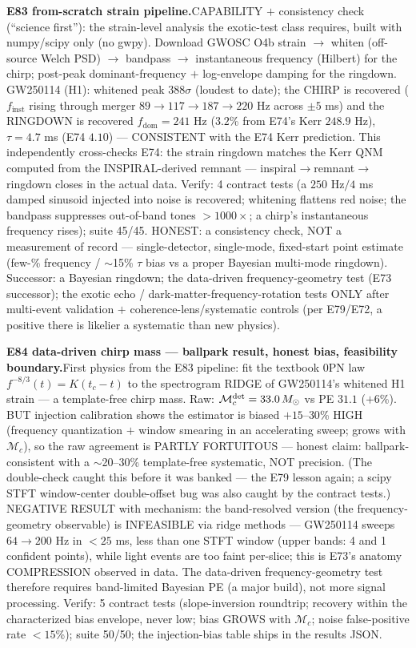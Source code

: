 \documentclass[10pt]{article}
\newcommand{\entry}[2]{\vspace{5pt}\noindent\textbf{#1}\quad #2\par}
\begin{document}
\entry{E83 from-scratch strain pipeline.}{CAPABILITY $+$ consistency check (``science first''): the
strain-level analysis the exotic-test class requires, built with numpy/scipy only (no gwpy). Download
GWOSC O4b strain $\to$ whiten (off-source Welch PSD) $\to$ bandpass $\to$ instantaneous frequency (Hilbert)
for the chirp; post-peak dominant-frequency $+$ log-envelope damping for the ringdown. GW250114 (H1):
whitened peak $388\sigma$ (loudest to date); the CHIRP is recovered ($f_{\mathrm{inst}}$ rising through
merger $89\to117\to187\to220$ Hz across $\pm5$ ms) and the RINGDOWN is recovered $f_{\mathrm{dom}}=241$ Hz
($3.2$\% from E74's Kerr $248.9$ Hz), $\tau=4.7$ ms (E74 $4.10$) --- CONSISTENT with the E74 Kerr
prediction. This independently cross-checks E74: the strain ringdown matches the Kerr QNM computed from the
INSPIRAL-derived remnant --- inspiral$\to$remnant$\to$ringdown closes in the actual data. Verify: 4 contract
tests (a $250$ Hz$/4$ ms damped sinusoid injected into noise is recovered; whitening flattens red noise;
the bandpass suppresses out-of-band tones $>1000\times$; a chirp's instantaneous frequency rises); suite
45/45. HONEST: a consistency check, NOT a measurement of record --- single-detector, single-mode,
fixed-start point estimate (few-\% frequency / $\sim$15\% $\tau$ bias vs a proper Bayesian multi-mode
ringdown). Successor: a Bayesian ringdown; the data-driven frequency-geometry test (E73 successor); the
exotic echo / dark-matter-frequency-rotation tests ONLY after multi-event validation $+$
coherence-lens/systematic controls (per E79/E72, a positive there is likelier a systematic than new
physics).}

\entry{E84 data-driven chirp mass --- ballpark result, honest bias, feasibility boundary.}{First physics
from the E83 pipeline: fit the textbook 0PN law $f^{-8/3}(t)=K(t_c-t)$ to the spectrogram RIDGE of
GW250114's whitened H1 strain --- a template-free chirp mass. Raw: $\mathcal{M}_c^{\rm det}=33.0\,M_\odot$
vs PE $31.1$ ($+6$\%). BUT injection calibration shows the estimator is biased $+15$--$30$\% HIGH
(frequency quantization $+$ window smearing in an accelerating sweep; grows with $\mathcal{M}_c$), so the
raw agreement is PARTLY FORTUITOUS --- honest claim: ballpark-consistent with a $\sim$20--30\%
template-free systematic, NOT precision. (The double-check caught this before it was banked --- the E79
lesson again; a scipy STFT window-center double-offset bug was also caught by the contract tests.)
NEGATIVE RESULT with mechanism: the band-resolved version (the frequency-geometry observable) is
INFEASIBLE via ridge methods --- GW250114 sweeps $64\to200$ Hz in $<25$ ms, less than one STFT window
(upper bands: 4 and 1 confident points), while light events are too faint per-slice; this is E73's
anatomy COMPRESSION observed in data. The data-driven frequency-geometry test therefore requires
band-limited Bayesian PE (a major build), not more signal processing. Verify: 5 contract tests
(slope-inversion roundtrip; recovery within the characterized bias envelope, never low; bias GROWS with
$\mathcal{M}_c$; noise false-positive rate $<15$\%); suite 50/50; the injection-bias table ships in the
results JSON.}
\end{document}
